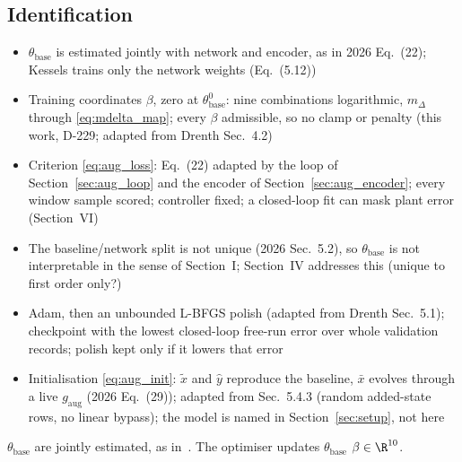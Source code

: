 \subsection{Identification}\label{sec:aug_closed_loop}
\ifdraft
\begin{itemize}
\item $\theta_{\mathrm{base}}$ is estimated jointly with network and encoder, as in 2026 Eq.~(22); Kessels trains only the network weights (Eq.~(5.12))
\item Training coordinates $\beta$, zero at $\theta^0_{\mathrm{base}}$: nine combinations logarithmic, $m_\Delta$ through \eqref{eq:mdelta_map}; every $\beta$ admissible, so no clamp or penalty (this work, D-229; adapted from Drenth Sec.~4.2)
\item Criterion \eqref{eq:aug_loss}: Eq.~(22) adapted by the loop of Section~\ref{sec:aug_loop} and the encoder of Section~\ref{sec:aug_encoder}; every window sample scored; controller fixed; a closed-loop fit can mask plant error (Section~VI)
\item The baseline/network split is not unique (2026 Sec.~5.2), so $\theta_{\mathrm{base}}$ is not interpretable in the sense of Section~I; Section~IV addresses this (unique to first order only?)
\item Adam, then an unbounded L-BFGS polish (adapted from Drenth Sec.~5.1); checkpoint with the lowest closed-loop free-run error over whole validation records; polish kept only if it lowers that error
\item Initialisation \eqref{eq:aug_init}: $\tilde x$ and $\hat y$ reproduce the baseline, $\bar x$ evolves through a live $g_{\mathrm{aug}}$ (2026 Eq.~(29)); adapted from Sec.~5.4.3 (random added-state rows, no linear bypass); the model is named in Section~\ref{sec:setup}, not here
\end{itemize}
\fi
{}
 $\theta_{\mathrm{base}}$ are jointly estimated,
as in~\cite[Eq.~(22)]{hoekstra2026lfr}.
The optimiser updates $\theta_{\mathrm{base}}$  $\beta\in\R^{10}$.

